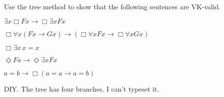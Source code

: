 \begin{exercise}
  Use the tree method to show that the following sentences are VK-valid.
  \begin{exlist}
  \item $\exists x \Box Fx \to \Box \exists x Fx$
  \item $\Box\forall x(Fx \to Gx) \to (\Box\forall x Fx \to \Box \forall x Gx)$ %
  \item $\Box \exists x \, x\!=\!x$
  \item $\Diamond Fa \to \Diamond \exists x Fx$
  \item $a\!=\!b \to \Box(a\!=\!a \to a\!=\!b)$
  \end{exlist}
\end{exercise}
\begin{solution}
  \begin{sollist}
    \item {}
    \medskip

    \item DIY. The tree has four branches. I can't typeset it.
    \medskip
    
    \item {}
    \medskip


\end{sollist}
\end{solution}
